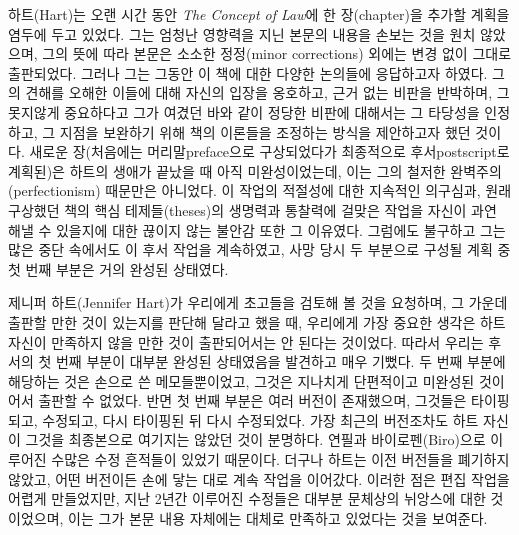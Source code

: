 \documentclass[12pt, oneside]{book}  %
\begin{document}
하트(Hart)는 오랜 시간 동안 \emph{The Concept of Law}에 한 장(chapter)을
추가할 계획을 염두에 두고 있었다. 그는 엄청난 영향력을 지닌 본문의
내용을 손보는 것을 원치 않았으며, 그의 뜻에 따라 본문은 소소한
정정(minor corrections) 외에는 변경 없이 그대로 출판되었다. 그러나 그는
그동안 이 책에 대한 다양한 논의들에 응답하고자 하였다. 그의 견해를
오해한 이들에 대해 자신의 입장을 옹호하고, 근거 없는 비판을 반박하며, 그
못지않게 중요하다고 그가 여겼던 바와 같이 정당한 비판에 대해서는 그
타당성을 인정하고, 그 지점을 보완하기 위해 책의 이론들을 조정하는 방식을
제안하고자 했던 것이다. 새로운 장(처음에는 머리말preface으로
구상되었다가 최종적으로 후서postscript로 계획된)은 하트의 생애가 끝났을
때 아직 미완성이었는데, 이는 그의 철저한 완벽주의(perfectionism)
때문만은 아니었다. 이 작업의 적절성에 대한 지속적인 의구심과, 원래
구상했던 책의 핵심 테제들(theses)의 생명력과 통찰력에 걸맞은 작업을
자신이 과연 해낼 수 있을지에 대한 끊이지 않는 불안감 또한 그 이유였다.
그럼에도 불구하고 그는 많은 중단 속에서도 이 후서 작업을 계속하였고,
사망 당시 두 부분으로 구성될 계획 중 첫 번째 부분은 거의 완성된
상태였다.

제니퍼 하트(Jennifer Hart)가 우리에게 초고들을 검토해 볼 것을 요청하며,
그 가운데 출판할 만한 것이 있는지를 판단해 달라고 했을 때, 우리에게 가장
중요한 생각은 하트 자신이 만족하지 않을 만한 것이 출판되어서는 안 된다는
것이었다. 따라서 우리는 후서의 첫 번째 부분이 대부분 완성된 상태였음을
발견하고 매우 기뻤다. 두 번째 부분에 해당하는 것은 손으로 쓴
메모들뿐이었고, 그것은 지나치게 단편적이고 미완성된 것이어서 출판할 수
없었다. 반면 첫 번째 부분은 여러 버전이 존재했으며, 그것들은 타이핑되고,
수정되고, 다시 타이핑된 뒤 다시 수정되었다. 가장 최근의 버전조차도 하트
자신이 그것을 최종본으로 여기지는 않았던 것이 분명하다. 연필과
바이로펜(Biro)으로 이루어진 수많은 수정 흔적들이 있었기 때문이다. 더구나
하트는 이전 버전들을 폐기하지 않았고, 어떤 버전이든 손에 닿는 대로 계속
작업을 이어갔다. 이러한 점은 편집 작업을 어렵게 만들었지만, 지난 2년간
이루어진 수정들은 대부분 문체상의 뉘앙스에 대한 것이었으며, 이는 그가
본문 내용 자체에는 대체로 만족하고 있었다는 것을 보여준다.
\end{document}
